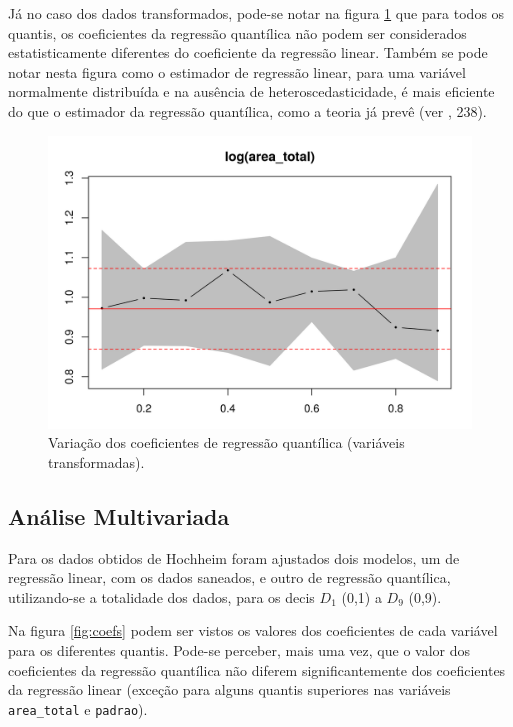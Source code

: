 \documentclass[a4paper, 12pt]{article}
\begin{document}
Já no caso dos dados transformados, pode-se notar na figura
\ref{fig:coef2} que para todos os quantis, os coeficientes da regressão
quantílica não podem ser considerados estatisticamente diferentes do
coeficiente da regressão linear. Também se pode notar nesta figura como
o estimador de regressão linear, para uma variável normalmente
distribuída e na ausência de heteroscedasticidade, é mais eficiente do
que o estimador da regressão quantílica, como a teoria já prevê (ver
\textcite{matloff2017}, 238).

\begin{figure}[H]

{\centering \includegraphics[width=0.7\linewidth]{images/coef2-1} 

}

\caption{Variação dos coeficientes de regressão quantílica (variáveis transformadas).}\label{fig:coef2}
\end{figure}

\hypertarget{analise-multivariada}{%
\subsection{Análise Multivariada}\label{analise-multivariada}}

Para os dados obtidos de Hochheim \autocite*[22-23]{hochheim} foram
ajustados dois modelos, um de regressão linear, com os dados saneados, e
outro de regressão quantílica, utilizando-se a totalidade dos dados,
para os decis \(D_1\) (0,1) a \(D_9\) (0,9).

Na figura \ref{fig:coefs} podem ser vistos os valores dos coeficientes
de cada variável para os diferentes quantis. Pode-se perceber, mais uma
vez, que o valor dos coeficientes da regressão quantílica não diferem
significantemente dos coeficientes da regressão linear (exceção para
alguns quantis superiores nas variáveis \texttt{area\_total} e
\texttt{padrao}).
\end{document}
